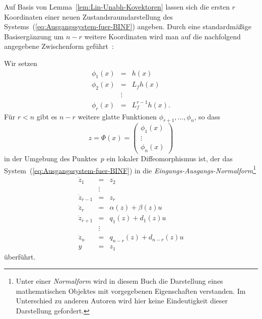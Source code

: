 Auf Basis von Lemma~\ref{lem:Lin-Unabh-Kovektoren} lassen sich die
ersten $r$ Koordinaten einer neuen Zustandsraumdarstellung des Systems~(\ref{eq:Ausgangssystem-fuer-BINF})
angeben. Durch eine standardmäßige Basisergänzung um $n-r$ weitere
Koordinaten wird man auf die nachfolgend angegebene Zwischenform geführt~\cite{chen1996,devasia1996}:
\begin{theorem}
\label{thm:EA-Form}Wir setzen 
\begin{equation}
\begin{array}{lcl}
\phi_{1}(x) & = & h(x)\\
\phi_{2}(x) & = & L_{f}h(x)\\
 & \vdots\\
\phi_{r}(x) & = & L_{f}^{r-1}h(x).
\end{array}\label{eq:Phi1}
\end{equation}
Für $r<n$ gibt es $n-r$ weitere glatte Funktionen $\phi_{r+1},\ldots,\phi_{n}$,
so dass 
\begin{equation}
z=\Phi(x)=\left(\begin{array}{c}
\phi_{1}(x)\\
\vdots\\
\phi_{n}(x)
\end{array}\right)\label{eq:Phi}
\end{equation}
in der Umgebung des Punktes~$p$ ein lokaler Diffeomorphismus ist,
der das System~(\ref{eq:Ausgangssystem-fuer-BINF}) in die \emph{Eingangs-Ausgangs-Normalform}\footnote{Unter einer \emph{Normalform} wird in diesem Buch die Darstellung
eines mathematischen Objektes mit vorgegebenen Eigenschaften verstanden.
Im Unterschied zu anderen Autoren wird hier keine Eindeutigkeit dieser
Darstellung gefordert.}
\begin{equation}
\begin{array}{lcl}
\dot{z}_{1} & = & z_{2}\\
 & \vdots\\
\dot{z}_{r-1} & = & z_{r}\\
\dot{z}_{r} & = & \alpha(z)+\beta(z)u\\
\dot{z}_{r+1} & = & q_{1}(z)+d_{1}(z)u\\
 & \vdots\\
\dot{z}_{n} & = & q_{n-r}(z)+d_{n-r}(z)u\\
y & = & z_{1}
\end{array}\label{eq:EA-Form-komponentenweise}
\end{equation}
überführt.
\end{theorem}
